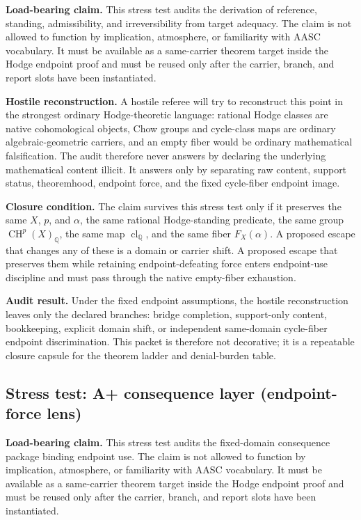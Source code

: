 \documentclass[11pt]{article}
\newcommand{\QQ}{\mathbb{Q}}
\newcommand{\CH}{\operatorname{CH}}
\newcommand{\clQ}{\operatorname{cl}_{\QQ}}
\begin{document}
\par\noindent\textbf{Load-bearing claim.} This stress test audits the derivation of reference, standing, admissibility, and irreversibility from target adequacy. The claim is not allowed to function by implication, atmosphere, or familiarity with AASC vocabulary. It must be available as a same-carrier theorem target inside the Hodge endpoint proof and must be reused only after the carrier, branch, and report slots have been instantiated.

\par\noindent\textbf{Hostile reconstruction.} A hostile referee will try to reconstruct this point in the strongest ordinary Hodge-theoretic language: rational Hodge classes are native cohomological objects, Chow groups and cycle-class maps are ordinary algebraic-geometric carriers, and an empty fiber would be ordinary mathematical falsification. The audit therefore never answers by declaring the underlying mathematical content illicit. It answers only by separating raw content, support status, theoremhood, endpoint force, and the fixed cycle-fiber endpoint image.

\par\noindent\textbf{Closure condition.} The claim survives this stress test only if it preserves the same $X$, $p$, and $\alpha$, the same rational Hodge-standing predicate, the same group $\CH^p(X)_\QQ$, the same map $\clQ$, and the same fiber $F_X(\alpha)$. A proposed escape that changes any of these is a domain or carrier shift. A proposed escape that preserves them while retaining endpoint-defeating force enters endpoint-use discipline and must pass through the native empty-fiber exhaustion.

\par\noindent\textbf{Audit result.} Under the fixed endpoint assumptions, the hostile reconstruction leaves only the declared branches: bridge completion, support-only content, bookkeeping, explicit domain shift, or independent same-domain cycle-fiber endpoint discrimination. This packet is therefore not decorative; it is a repeatable closure capsule for the theorem ladder and denial-burden table.


\subsection{Stress test: A+ consequence layer (endpoint-force lens)}

\par\noindent\textbf{Load-bearing claim.} This stress test audits the fixed-domain consequence package binding endpoint use. The claim is not allowed to function by implication, atmosphere, or familiarity with AASC vocabulary. It must be available as a same-carrier theorem target inside the Hodge endpoint proof and must be reused only after the carrier, branch, and report slots have been instantiated.
\end{document}
